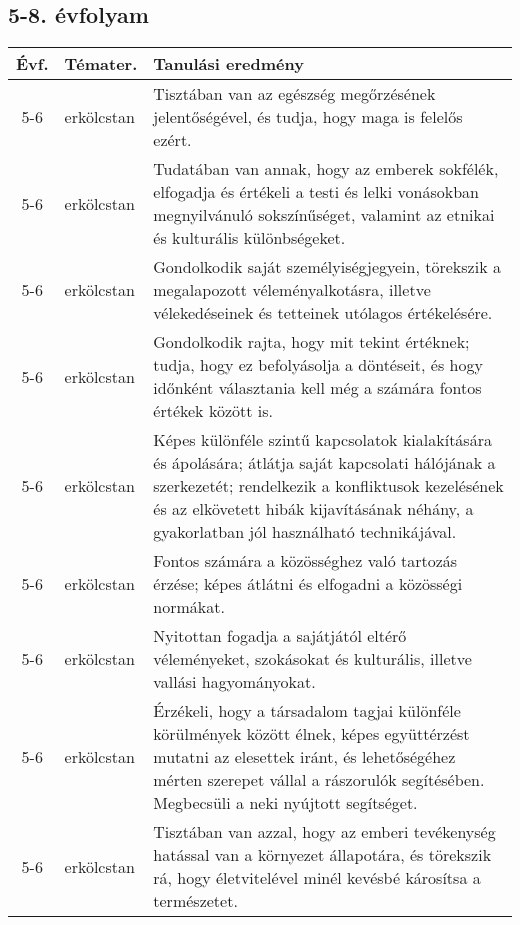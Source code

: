 \subsection{5-8. évfolyam}
\begin{small}
  \begin{longtable}{c | p{2cm} |  p{11cm} }
    \textbf{Évf.} & \textbf{Témater.} & \textbf{Tanulási eredmény} \\ \hline \hline
    \endhead

              5-6 & erkölcstan & Tisztában van az egészség megőrzésének jelentőségével, és tudja, hogy maga is felelős ezért. \\ \hline
              5-6 & erkölcstan & Tudatában van annak, hogy az emberek sokfélék, elfogadja és értékeli a testi és lelki vonásokban megnyilvánuló sokszínűséget, valamint az etnikai és kulturális különbségeket. \\ \hline
              5-6 & erkölcstan & Gondolkodik saját személyiségjegyein, törekszik a megalapozott véleményalkotásra, illetve vélekedéseinek és tetteinek utólagos értékelésére. \\ \hline
              5-6 & erkölcstan & Gondolkodik rajta, hogy mit tekint értéknek; tudja, hogy ez befolyásolja a döntéseit, és hogy időnként választania kell még a számára fontos értékek között is. \\ \hline
              5-6 & erkölcstan & Képes különféle szintű kapcsolatok kialakítására és ápolására; átlátja saját kapcsolati hálójának a szerkezetét; rendelkezik a konfliktusok kezelésének és az elkövetett hibák kijavításának néhány, a gyakorlatban jól használható technikájával. \\ \hline
              5-6 & erkölcstan & Fontos számára a közösséghez való tartozás érzése; képes átlátni és elfogadni a közösségi normákat. \\ \hline
              5-6 & erkölcstan & Nyitottan fogadja a sajátjától eltérő véleményeket, szokásokat és kulturális, illetve vallási hagyományokat. \\ \hline
              5-6 & erkölcstan & Érzékeli, hogy a társadalom tagjai különféle körülmények között élnek, képes együttérzést mutatni az elesettek iránt, és lehetőségéhez mérten szerepet vállal a rászorulók segítésében. Megbecsüli a neki nyújtott segítséget. \\ \hline
              5-6 & erkölcstan & Tisztában van azzal, hogy az emberi tevékenység hatással van a környezet állapotára, és törekszik rá, hogy életvitelével minél kevésbé károsítsa a természetet. \\ \hline

\end{longtable}
\end{small}
